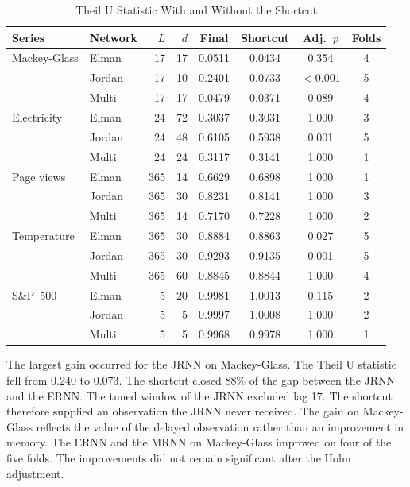\documentclass[conference,10pt]{IEEEtran}
\begin{document}
\begin{table}[t]
\centering
\caption{Theil U Statistic With and Without the Shortcut}
\label{tab:shortcut}
\footnotesize
\setlength{\tabcolsep}{3pt}
\begin{tabular}{@{}llrrcccc@{}}
\toprule
Series & Network & $L$ & $d$ & Final & Shortcut & Adj.\ $p$ & Folds \\
\midrule
Mackey-Glass & Elman  & 17 & 17 & 0.0511 & 0.0434 & 0.354 & 4 \\
             & Jordan & 17 & 10 & 0.2401 & 0.0733 & $<0.001$ & 5 \\
             & Multi  & 17 & 17 & 0.0479 & 0.0371 & 0.089 & 4 \\
\midrule
Electricity  & Elman  & 24 & 72 & 0.3037 & 0.3031 & 1.000 & 3 \\
             & Jordan & 24 & 48 & 0.6105 & 0.5938 & 0.001 & 5 \\
             & Multi  & 24 & 24 & 0.3117 & 0.3141 & 1.000 & 1 \\
\midrule
Page views   & Elman  & 365 & 14 & 0.6629 & 0.6898 & 1.000 & 1 \\
             & Jordan & 365 & 30 & 0.8231 & 0.8141 & 1.000 & 3 \\
             & Multi  & 365 & 14 & 0.7170 & 0.7228 & 1.000 & 2 \\
\midrule
Temperature  & Elman  & 365 & 30 & 0.8884 & 0.8863 & 0.027 & 5 \\
             & Jordan & 365 & 30 & 0.9293 & 0.9135 & 0.001 & 5 \\
             & Multi  & 365 & 60 & 0.8845 & 0.8844 & 1.000 & 4 \\
\midrule
S\&P~500     & Elman  & 5 & 20 & 0.9981 & 1.0013 & 0.115 & 2 \\
             & Jordan & 5 & 5  & 0.9997 & 1.0008 & 1.000 & 2 \\
             & Multi  & 5 & 5  & 0.9968 & 0.9978 & 1.000 & 1 \\
\bottomrule
\end{tabular}
\end{table}

The largest gain occurred for the JRNN on Mackey-Glass.
The Theil U statistic fell from 0.240 to 0.073.
The shortcut closed 88\% of the gap between the JRNN and the ERNN.
The tuned window of the JRNN excluded lag 17.
The shortcut therefore supplied an observation the JRNN never received.
The gain on Mackey-Glass reflects the value of the delayed observation
rather than an improvement in memory.
The ERNN and the MRNN on Mackey-Glass improved on four of the five
folds.
The improvements did not remain significant after the Holm adjustment.
\end{document}
